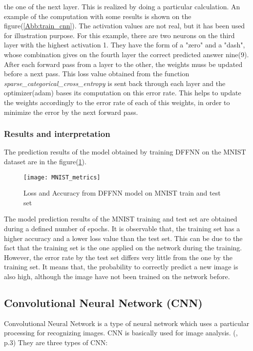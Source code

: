 the one of the next layer. This is realized by doing a particular calculation. 
An example of the computation with some results is shown on the figure(\ref{Abb:train_cnn}). The activation values 
are not real, but it has been used for illustration purpose. 
For this example, there are two neurons on the third layer with the highest activation 1. They have the form of a "zero" and a 
"dash", whose combination gives on the fourth layer the correct predicted answer nine(9).
After each forward pass from a layer to the other, the weights muss be updated before a next pass. 
This loss value obtained from the function \emph{sparse\_categorical\_cross\_entropy} is sent back through each layer and the 
optimizer(adam) bases its computation on this error rate. This helps to update 
the weights accordingly to the error rate of each of this weights, in order to minimize the error by the next forward pass. 


\subsubsection{Results and interpretation}
The prediction results of the model obtained by training DFFNN on the MNIST dataset are in the figure(\ref{Abb:mnist_metrics}). 

\begin{figure}[htb]
	\centering
	\texttt{[image: MNIST\_metrics]}
	\caption[Results of DFFNN model on MNIST]{Loss and Accuracy from DFFNN model on MNIST train and test set} \label{Abb:mnist_metrics}
\end{figure}

The model prediction results of the MNIST training and test set are obtained during a defined number of epochs.
It is observable that, the training set has a higher accuracy and a lower loss value
than the test set.
This can be due to the fact that the training set is the one applied on the network during the training. 
However, the error rate by the test set differs very little from the one by the training set.
It means that, the probability to correctly predict a new image is also high, although the image have not 
been trained on the network before. 


\subsection{Convolutional Neural Network (CNN)}
Convolutional Neural Network is a type of neural network which uses a particular processing for recognizing images. 
CNN is basically used for image analysis. (\cite{[6]}, p.3)
They are three types of CNN: 

